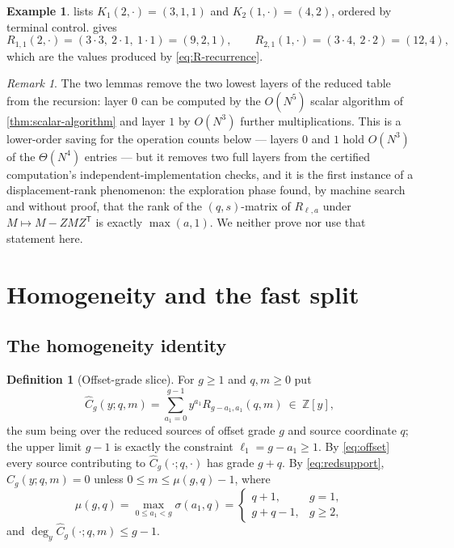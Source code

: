 \documentclass[11pt,reqno]{amsart}
\theoremstyle{definition}
\newtheorem{definition}[theorem]{Definition}
\newtheorem{example}[theorem]{Example}
\theoremstyle{remark}
\newtheorem{remark}[theorem]{Remark}
\newcommand{\Chat}{\widehat C}
\begin{document}
\begin{example}\label{ex:layer-one}
 lists $K_1(2,\cdot)=(3,1,1)$ and
$K_2(1,\cdot)=(4,2)$, ordered by terminal control.  
gives
\[
 R_{1,1}(2,\cdot)=(3\cdot3,\ 2\cdot1,\ 1\cdot1)=(9,2,1),
 \qquad
 R_{2,1}(1,\cdot)=(3\cdot4,\ 2\cdot2)=(12,4),
\]
which are the values produced by \eqref{eq:R-recurrence}.
\end{example}

\begin{remark}\label{rem:layers-two}
The two lemmas remove the two lowest layers of the reduced table from the
recursion: layer $0$ can be computed by the $O(N^5)$ scalar algorithm of
\cref{thm:scalar-algorithm} and layer $1$ by $O(N^3)$ further
multiplications.  This is a lower-order saving for the operation counts
below --- layers $0$ and $1$ hold $O(N^3)$ of the $\Theta(N^4)$ entries ---
but it removes two full layers from the certified computation's
independent-implementation checks, and it is the first instance of a
displacement-rank phenomenon: the exploration phase found, by machine
search and without proof, that the rank of the $(q,s)$-matrix of
$R_{\ell,a}$ under $M\mapsto M-ZMZ^{\mathsf T}$ is exactly $\max(a,1)$.  We
neither prove nor use that statement here.
\end{remark}

\section{Homogeneity and the fast split}\label{sec:fast}

\subsection{The homogeneity identity}

\begin{definition}[Offset-grade slice]\label{def:chat}
For $g\geq1$ and $q,m\geq0$ put
\begin{equation}\label{eq:chat}
 \Chat_g(y;q,m)=\sum_{a_1=0}^{g-1}y^{a_1}R_{g-a_1,a_1}(q,m)
 \ \in\ \mathbb Z[y],
\end{equation}
the sum being over the reduced sources of offset grade $g$ and source
coordinate $q$; the upper limit $g-1$ is exactly the constraint
$\ell_1=g-a_1\geq1$.  By \eqref{eq:offset} every source contributing to
$\Chat_g(\cdot;q,\cdot)$ has grade $g+q$.  By \eqref{eq:redsupport},
$\Chat_g(y;q,m)=0$ unless $0\leq m\leq\mu(g,q)-1$, where
\begin{equation}\label{eq:mu}
 \mu(g,q)=\max_{0\leq a_1<g}\sigma(a_1,q)=
 \begin{cases} q+1,&g=1,\\ g+q-1,&g\geq2,\end{cases}
\end{equation}
and $\deg_y\Chat_g(\cdot;q,m)\leq g-1$.
\end{definition}
\end{document}
